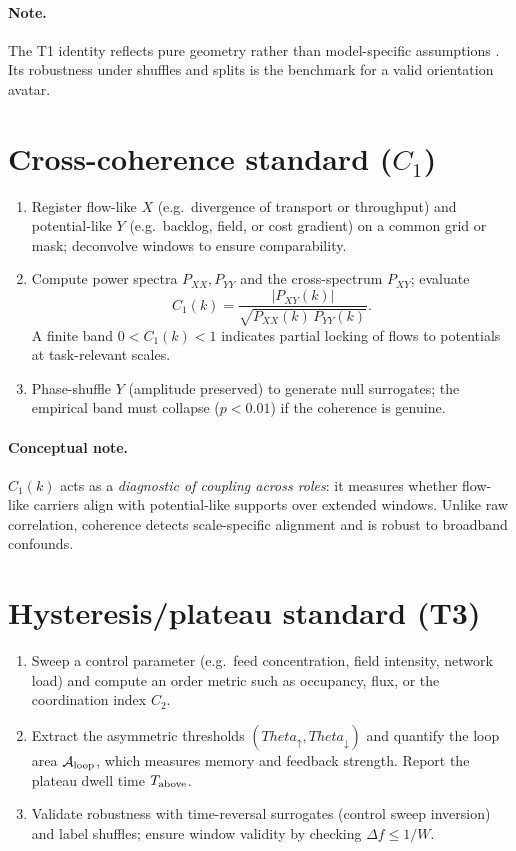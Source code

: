 \documentclass[12pt,a4paper,oneside]{scrreprt}
\def\Theta{Theta}%
\begin{document}
\paragraph{Note.}
The T1 identity reflects pure geometry rather than model-specific assumptions \cite{Griffiths1999,Jackson1999}. 
Its robustness under shuffles and splits \cite{Newman2010,Theiler1992} is the benchmark for a valid orientation avatar.

\section*{Cross-coherence standard ($C_1$)}
\begin{enumerate}
\item Register flow-like $X$ (e.g.\ divergence of transport or throughput) and potential-like $Y$ (e.g.\ backlog, field, or cost gradient) on a common grid or mask; deconvolve windows to ensure comparability.
\item Compute power spectra $P_{XX},P_{YY}$ and the cross-spectrum $P_{XY}$; evaluate
\[
C_1(k)=\frac{|P_{XY}(k)|}{\sqrt{P_{XX}(k)\,P_{YY}(k)}}.
\]
A finite band $0<C_1(k)<1$ indicates partial locking of flows to potentials at task-relevant scales.
\item Phase-shuffle $Y$ (amplitude preserved) to generate null surrogates; the empirical band must collapse ($p<0.01$) if the coherence is genuine.
\end{enumerate}

\paragraph{Conceptual note.}
$C_1(k)$ acts as a \emph{diagnostic of coupling across roles}: it measures whether flow-like carriers align with potential-like supports over extended windows. Unlike raw correlation, coherence detects scale-specific alignment and is robust to broadband confounds.


\section*{Hysteresis/plateau standard (T3)}
\begin{enumerate}
\item Sweep a control parameter (e.g.\ feed concentration, field intensity, network load) and compute an order metric such as occupancy, flux, or the coordination index $C_2$.
\item Extract the asymmetric thresholds $(\Theta_\uparrow,\Theta_\downarrow)$ and quantify the loop area $\mathcal A_{\rm loop}$, which measures memory and feedback strength. Report the plateau dwell time $T_{\rm above}$.
\item Validate robustness with time-reversal surrogates (control sweep inversion) and label shuffles; ensure window validity by checking $\Delta f \le 1/W$.
\end{enumerate}
\end{document}
